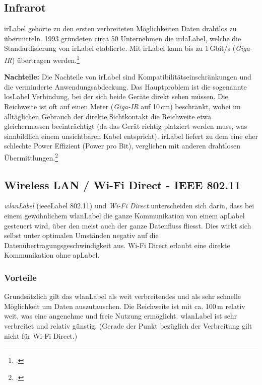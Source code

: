 


\subsection{Infrarot}
\gls{irLabel} gehörte zu den ersten verbreiteten Möglichkeiten Daten drahtlos zu übermitteln.
1993 gründeten circa 50 Unternehmen die \gls{irdaLabel}, welche die Standardisierung von \gls{irLabel} etablierte.
Mit \gls{irLabel} kann bis zu 1\,Gbit/s (\textit{Giga-IR}) übertragen werden.\footcite{Infrared_Data_Association_Wikipedia_2015-05-22}

\textbf{Nachteile:}
Die Nachteile von \gls{irLabel} sind Kompatibilitätseinschränkungen und die verminderte Anwendungsabdeckung.
Das Hauptproblem ist die sogenannte \gls{losLabel} Verbindung, bei der sich beide Geräte direkt sehen müssen.
Die Reichweite ist oft auf einen Meter (\textit{Giga-IR} auf 10\,cm) beschränkt, wobei im alltäglichen Gebrauch der direkte Sichtkontakt die Reichweite etwa gleichermassen beeinträchtigt (da das Gerät richtig platziert werden muss, was sinnbildlich einem unsichtbaren Kabel entspricht).
\gls{irLabel} liefert zu dem eine eher schlechte Power Effizient (Power pro Bit), verglichen mit anderen drahtlosen Übermittlungen.\footcite{Comparing_Low_Power_Wireless_Technologies_DigiKey_2015-05-22}


\subsection{Wireless LAN / Wi-Fi Direct - IEEE 802.11}
\textit{\gls{wlanLabel}} (\gls{ieeeLabel} 802.11) und \textit{Wi-Fi Direct} unterscheiden sich darin, dass bei einem gewöhnlichem \gls{wlanLabel} die ganze Kommunikation von einem \gls{apLabel} gesteuert wird, über den meist auch der ganze Datenfluss fliesst. Dies wirkt sich selbst unter optimalen Umständen negativ auf die Datenübertragungsgeschwindigkeit aus.
Wi-Fi Direct erlaubt eine direkte Kommunikation ohne \gls{apLabel}.

\subsubsection{Vorteile}
Grundsätzlich gilt das \gls{wlanLabel} als weit verbreitendes und als sehr schnelle Möglichkeit um Daten auszutauschen. Die Reichweite ist mit ca. 100\,m relativ weit, was eine angenehme und freie Nutzung ermöglicht.
\gls{wlanLabel} ist sehr verbreitet und relativ günstig. (Gerade der Punkt bezüglich der Verbreitung gilt nicht für Wi-Fi Direct.)

